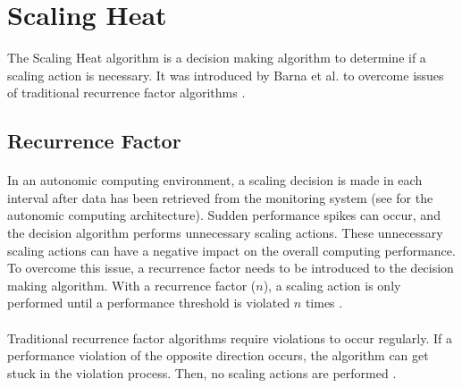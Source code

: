 \section{Scaling Heat}
\label{sec:04_scal-heat}
The Scaling Heat algorithm is a decision making algorithm to determine if a scaling action is necessary.
It was introduced by Barna et al. \cite{Barna2017ElasticContainerApps} to overcome issues of traditional recurrence factor algorithms \cite{Barna2017ElasticContainerApps}.


\subsection{Recurrence Factor}
\paragraph{}
In an autonomic computing environment, a scaling decision is made in each interval after data has been retrieved from the monitoring system (see  for the autonomic computing architecture). 
Sudden performance spikes can occur, and the decision algorithm performs unnecessary scaling actions.
These unnecessary scaling actions can have a negative impact on the overall computing performance.
To overcome this issue, a recurrence factor needs to be introduced to the decision making algorithm.
With a recurrence factor ($n$), a scaling action is only performed until a performance threshold is violated $n$ times \cite{Barna2017ElasticContainerApps}.


\paragraph{}Traditional recurrence factor algorithms require violations to occur regularly. If a performance violation of the opposite direction occurs, the algorithm can get stuck in the violation process. Then, no scaling actions are performed \cite{Barna2017ElasticContainerApps}.



